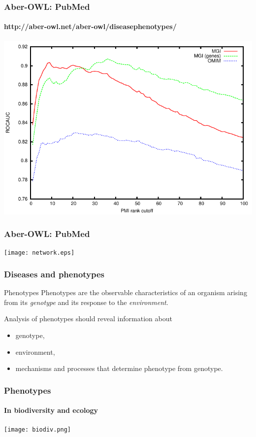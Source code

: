 \documentclass{beamer}
\renewcommand{\em}{\itshape}
\begin{document}
\begin{frame}
  \frametitle{Aber-OWL: PubMed}
  \framesubtitle{http://aber-owl.net/aber-owl/diseasephenotypes/}
  \centerline{\includegraphics[width=1\textwidth]{pmi-auc-plot.pdf}}
\end{frame}

\begin{frame}
  \frametitle{Aber-OWL: PubMed}
  \centerline{\texttt{[image: network.eps]}}
\end{frame}

\begin{frame}
  \frametitle{Diseases and phenotypes}
  \begin{block}{Phenotypes}
    Phenotypes are the observable characteristics of an organism arising
    from its {\em genotype} and its response to the {\em environment}.
  \end{block}
  \vspace{1cm}
  
  Analysis of phenotypes should reveal information about
  \begin{itemize}
  \item genotype,
  \item environment,
  \item mechanisms and processes that determine phenotype from genotype.
  \end{itemize}
\end{frame}

\begin{frame}
\frametitle{Phenotypes}
\framesubtitle{In biodiversity and ecology}
\centerline{\texttt{[image: biodiv.png]}}
\end{frame}
\end{document}
